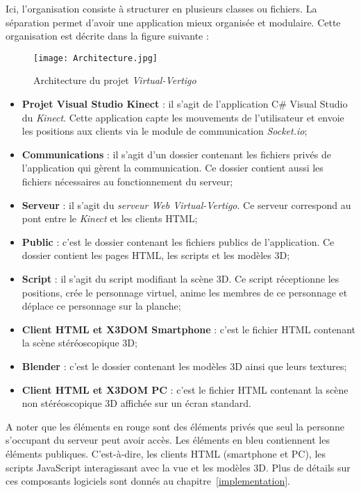 Ici, l'organisation consiste à structurer en plusieurs classes ou fichiers. La séparation permet d'avoir une application mieux organisée et modulaire. Cette organisation est décrite dans la figure suivante :
\begin{figure}[H]
	\centering
   		\texttt{[image: Architecture.jpg]}
   	\caption{\label{architecture} Architecture du projet \textit{Virtual-Vertigo}}
\end{figure}

\begin{itemize}
\item \textbf{Projet Visual Studio Kinect} : il s'agit de l'application C\# Visual Studio du \textit{Kinect}. Cette application capte les mouvements de l'utilisateur et envoie les positions aux clients via le module de communication \textit{Socket.io};
\item \textbf{Communications} : il s'agit d'un dossier contenant les fichiers privés de l'application qui gèrent la communication. Ce dossier contient aussi les fichiers nécessaires au fonctionnement du serveur;
\item \textbf{Serveur} : il s'agit du \textit{serveur Web Virtual-Vertigo}. Ce serveur correspond au pont entre le \textit{Kinect} et les clients HTML;
\item \textbf{Public} : c'est le dossier contenant les fichiers publics de l'application. Ce dossier contient les pages HTML, les scripts et les modèles 3D; 
\item \textbf{Script} : il s'agit du script modifiant la scène 3D. Ce script réceptionne les positions, crée le personnage virtuel, anime les membres de ce personnage et déplace ce personnage sur la planche;
\item \textbf{Client HTML et X3DOM Smartphone} : c'est le fichier HTML contenant la scène stéréoscopique 3D;
\item \textbf{Blender} : c'est le dossier contenant les modèles 3D ainsi que leurs textures;
\item \textbf{Client HTML et X3DOM PC} : c'est le fichier HTML contenant la scène non stéréoscopique 3D affichée sur un écran standard.\\ \linebreak
 
\end{itemize} 

A noter que les éléments en rouge sont des éléments privés que seul la personne s'occupant du serveur peut avoir accès. Les éléments en bleu contiennent les éléments publiques. C'est-à-dire, les clients HTML (\textsf{smartphone} et PC), les scripts JavaScript interagissant avec la vue et les modèles 3D. Plus de détails sur ces composants logiciels sont donnés au chapitre~\ref{implementation}.\\

